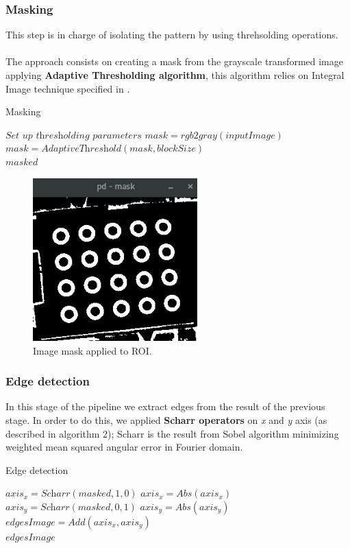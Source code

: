 \documentclass[journal]{IEEEtran}
\begin{document}
\subsubsection{ Masking }
This step is in charge of isolating the pattern by using threhsolding operations.
\\
\\
The approach consists on creating a mask from the grayscale transformed image applying \textbf{Adaptive Thresholding algorithm}, this algorithm relies on Integral Image technique specified in \cite{IntegralImageThresholding}.
\begin{algorithm}
\caption{Masking}
\label{alg:mask2}
\begin{algorithmic}[1]
\State $\textit{Set up thresholding parameters}$
\State $mask   = \textit{rgb2gray}( inputImage )$
\State $mask   = \textit{AdaptiveThreshold}(mask, blockSize)$\\
\Return $masked$
\end{algorithmic}
\end{algorithm}
\begin{figure}[H]
\centering
\includegraphics[width=2.5in]{_img/img_report2_mask.png}
\caption{Image mask applied to ROI.}
\end{figure}

\subsubsection{Edge detection}
In this stage of the pipeline we extract edges from the result of the previous stage. In order to do this, we applied \textbf{Scharr operators} on \textit{x} and \textit{y} axis (as described in algorithm 2); Scharr is the result from Sobel algorithm minimizing weighted mean squared angular error in Fourier domain.
\begin{algorithm}
\caption{Edge detection}
\begin{algorithmic}[1]
\State $axis_x   = \textit{Scharr}(masked, 1, 0)$
\State $axis_x   = \textit{Abs}(axis_x)$
\State $axis_y   = \textit{Scharr}(masked, 0, 1)$
\State $axis_y   = \textit{Abs}(axis_y)$
\State $edgesImage   = \textit{Add}(axis_x, axis_y)$ \\
\Return $edgesImage$
\end{algorithmic}
\end{algorithm}
\end{document}
